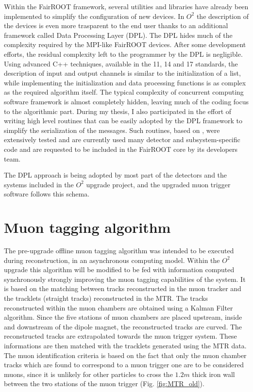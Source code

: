 Within the FairROOT framework, several utilities and libraries have already been implemented to simplify the configuration of new devices.
In $O^2$ the description of the devices is even more trasparent to the end user thanks to an additional framework called Data Processing Layer (DPL).
The DPL hides much of the complexity required by the MPI-like FairROOT devices.
After some development efforts, the residual complexity left to the programmer by the DPL is negligible.
Using advanced C++ techniques, available in the 11, 14 and 17 standards, the description of input and output channels is similar to the initialization of a list, while implementing the initialization and data processing functions is as complex as the required algorithm itself.
The typical complexity of concurrent computing software framework is almost completely hidden, leaving much of the coding focus to the algorithmic part.
During my thesis, I also participated in the effort of writing high level routines that can be easily adopted by the DPL framework to simplify the serialization of the messages. 
Such routines, based on , were extensively tested and are currently used many detector and subsystem-specific code and are requested to be included in the FairROOT core by its developers team.

The DPL approach is being adopted by most part of the detectors and the systems included in the $O^2$ upgrade project, and the upgraded muon trigger software follows this schema.

\section{Muon tagging algorithm}
\label{MTR_tagging}
The pre-upgrade offline muon tagging algorithm was intended to be executed during reconstruction, in an asynchronous computing model.
Within the $O^2$ upgrade this algorithm will be modified to be fed with information computed synchronously strongly improving the muon tagging capabilities of the system.
It is based on the matching between tracks reconstructed in the muon tracker and the tracklets (straight tracks) reconstructed in the MTR.
The tracks reconstructed within the muon chambers are obtained using a Kalman Filter algorithm.
Since the five stations of muon chambers are placed upstream, inside and downstream of the dipole magnet, the reconstructed tracks are curved.
The reconstructed tracks are extrapolated towards the muon trigger system.
These informations are then matched with the tracklets generated using the MTR data.
The muon identification criteria is based on the fact that only the muon chamber tracks which are found to correspond to a muon trigger one are to be considered muons, since it is unlikely for other particles to cross the $1.2m$ thick iron wall between the two stations of the muon trigger (Fig. \ref{fig:MTR_old}).

